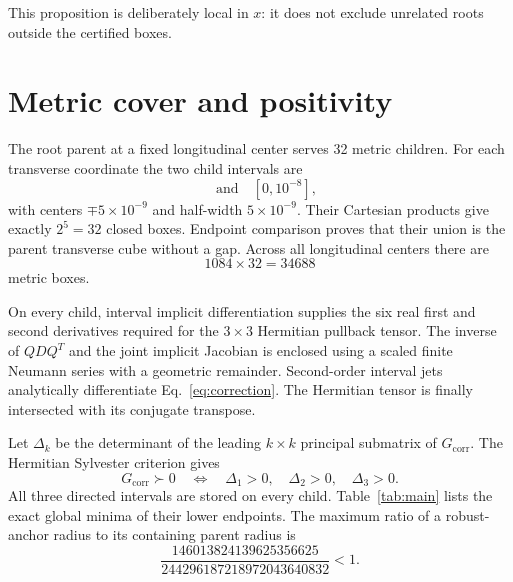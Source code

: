 \documentclass[11pt]{article}
\newcommand{\Gc}{G_{\mathrm{corr}}}
\begin{document}
This proposition is deliberately local in $x$: it does not exclude unrelated
roots outside the certified boxes.

\section{Metric cover and positivity}

The root parent at a fixed longitudinal center serves 32 metric children.
For each transverse coordinate the two child intervals are
\begin{equation}
 [-10^{-8},0]\quad\text{and}\quad[0,10^{-8}],
\end{equation}
with centers $\mp5\times10^{-9}$ and half-width $5\times10^{-9}$.  Their
Cartesian products give exactly $2^5=32$ closed boxes.  Endpoint comparison
proves that their union is the parent transverse cube without a gap.  Across
all longitudinal centers there are
\begin{equation}
 1084\times32=34688
\end{equation}
metric boxes.

On every child, interval implicit differentiation supplies the six real first
and second derivatives required for the $3\times3$ Hermitian pullback tensor.
The inverse of $QDQ^T$ and the joint implicit Jacobian is enclosed using a
scaled finite Neumann series with a geometric remainder.  Second-order
interval jets analytically differentiate Eq.~\eqref{eq:correction}.  The
Hermitian tensor is finally intersected with its conjugate transpose.

Let $\Delta_k$ be the determinant of the leading $k\times k$ principal
submatrix of $\Gc$.  The Hermitian Sylvester criterion gives
\begin{equation}\label{eq:sylvester}
 \Gc\succ0\quad\Longleftrightarrow\quad
 \Delta_1>0,\quad\Delta_2>0,\quad\Delta_3>0.
\end{equation}
All three directed intervals are stored on every child.  Table~\ref{tab:main}
lists the exact global minima of their lower endpoints.
The maximum ratio of a robust-anchor radius to its containing parent radius is
\begin{equation}\label{eq:anchorratio}
 \frac{146013824139625356625}{244296187218972043640832}<1.
\end{equation}
\end{document}
